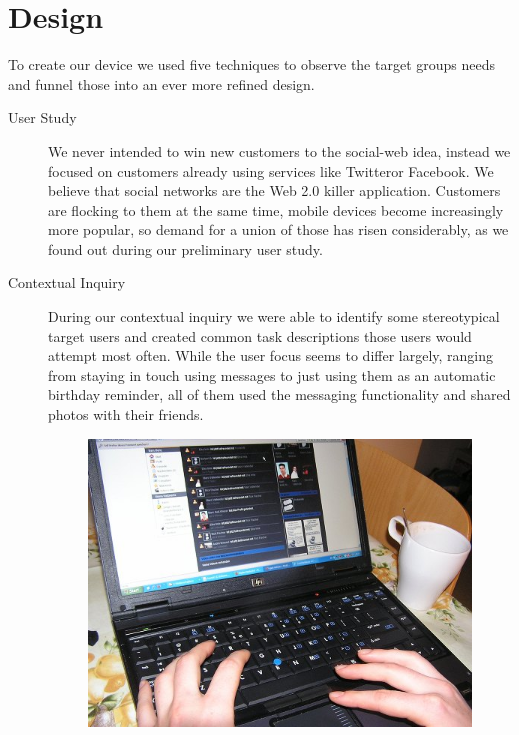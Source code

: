 %
%
%
\section{Design}
%
To create our device we used five techniques 
to observe the target groups needs and funnel those 
into an ever more refined design. 
\begin{description}
  \item[User Study] We never intended to win new customers to 
    the social-web idea, instead we focused on customers already 
    using services like Twitter\trademark or Facebook\registered. 
    We believe that social networks are the Web 2.0 killer application. 
    Customers are flocking to them at the same time, mobile devices
    become increasingly more popular, so demand for a union of 
    those has risen considerably, as we found out during our preliminary 
    user study.
  \item[Contextual Inquiry]
    During our contextual inquiry we were able to identify some stereotypical 
    target users and created common task descriptions those users would 
    attempt most often. While the user focus seems to differ largely, ranging 
    from staying in touch using messages to just using them as an automatic 
    birthday reminder, all of them used the messaging functionality and 
    shared photos with their friends. 
\begin{figure}[h]
  \begin{center}
    \includegraphics[width=0.8\linewidth]{imgs/context.png}

\end{center}
\end{figure}
\end{description}

